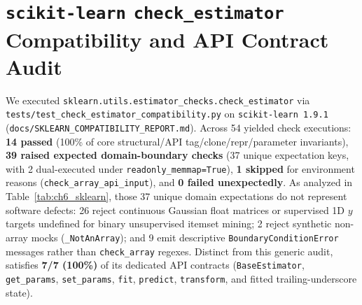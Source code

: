 \section{\texttt{scikit-learn} \texttt{check\_\protect\allowbreak{}estimator} Compatibility and API Contract Audit}
We executed \texttt{sklearn.utils.estimator\_\protect\allowbreak{}checks.check\_\protect\allowbreak{}estimator} via \texttt{tests/test\_\protect\allowbreak{}check\_\protect\allowbreak{}estimator\_\protect\allowbreak{}compatibility.py} on \texttt{scikit-learn 1.9.1} (\texttt{docs/SKLEARN\_\protect\allowbreak{}COMPATIBILITY\_\protect\allowbreak{}REPORT.md}). Across 54 yielded check executions: \textbf{14 passed} (100\% of core structural/API tag/clone/repr/parameter invariants), \textbf{39 raised expected domain-boundary checks} (37 unique expectation keys, with 2 dual-executed under \texttt{readonly\_\protect\allowbreak{}memmap=True}), \textbf{1 skipped} for environment reasons (\texttt{check\_\protect\allowbreak{}array\_\protect\allowbreak{}api\_\protect\allowbreak{}input}), and \textbf{0 failed unexpectedly}. As analyzed in Table~\ref{tab:ch6_sklearn}, those 37 unique domain expectations do not represent software defects: 26 reject continuous Gaussian float matrices or supervised 1D $y$ targets undefined for binary unsupervised itemset mining; 2 reject synthetic non-array mocks (\texttt{\_\protect\allowbreak{}NotAnArray}); and 9 emit descriptive \texttt{Boundary\protect\allowbreak{}Condition\protect\allowbreak{}Error} messages rather than \texttt{check\_\protect\allowbreak{}array} regexes. Distinct from this generic audit, \skarm satisfies \textbf{7/7 (100\%)} of its dedicated API contracts (\texttt{BaseEstimator}, \texttt{get\_\protect\allowbreak{}params}, \texttt{set\_\protect\allowbreak{}params}, \texttt{fit}, \texttt{predict}, \texttt{transform}, and fitted trailing-underscore state).

